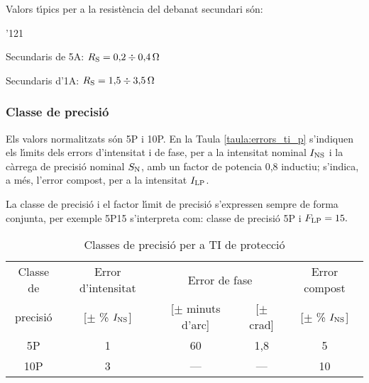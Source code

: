 Valors t\'{\i}pics per a la resist\`{e}ncia del debanat secundari s\'{o}n:
\begin{dinglist}{'121}
    \item Secundaris de 5\unit{A}: $R_\mathrm{S} = 0{,}2\div 0{,}4\mathrm{\,\mathrm{\Omega}}$
    \item Secundaris d'1\unit{A}:  $R_\mathrm{S} = 1{,}5 \div3{,}5\mathrm{\,\mathrm{\Omega}}$
\end{dinglist}

\subsubsection{Classe de precisi\'{o}}

 Els valors normalitzats s\'{o}n 5P i 10P.
En la Taula \vref{taula:errors_ti_p} s'indiquen els l\'{\i}mits dels
errors d'intensitat i de fase,  per a la intensitat nominal
$I_\mathrm{NS}$ i  la c\`{a}rrega de precisi\'{o} nominal $S_\mathrm{N}$,  amb un
factor de potencia 0,8 inductiu; s'indica, a m\'{e}s, l'error
compost, per a la intensitat $I_\mathrm{LP}$.

La classe de precisi\'{o} i el factor l\'{\i}mit de precisi\'{o} s'expressen
sempre de forma conjunta, per exemple 5P15 s'interpreta com: classe
de precisi\'{o} 5P i $F_\mathrm{LP}=15.$ \pagebreak
\begin{table}[h]
    \caption{\label{taula:errors_ti_p} Classes de precisi\'{o} per a TI de protecci\'{o}}
    \begin{center}\begin{tabular}{ccccc}
    \toprule[1pt]
    Classe de & Error d'intensitat & \multicolumn{2}{c}{Error de fase} &
    Error compost\\
    \cmidrule(rl){3-4}
    precisi\'{o} &  [$\pm$ \% $I_\mathrm{NS}$] & [$\pm$ minuts d'arc]  & [$\pm$ crad]
    & [$\pm$ \% $I_\mathrm{NS}$]\\
    \midrule
    5P & 1 & 60 & 1,8 & 5 \\
    10P & 3 & --- & --- & 10\\
    \bottomrule[1pt]
    \end{tabular} \end{center}
\end{table}


